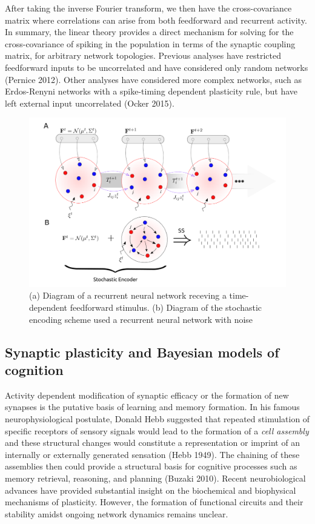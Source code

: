 \documentclass{ucetd}
\begin{document}
After taking the inverse Fourier transform, we then have the cross-covariance matrix where correlations can arise from both feedforward and recurrent activity. In summary, the linear theory provides a direct mechanism for solving for the cross-covariance of spiking in the population in terms of the synaptic coupling matrix, for arbitrary network topologies. Previous analyses have restricted feedforward inputs to be uncorrelated and have considered only random networks (Pernice 2012). Other analyses have considered more complex networks, such as Erdos-Renyni networks with a spike-timing dependent plasticity rule, but have left external input uncorrelated (Ocker 2015).

\begin{figure}[t!]
\centering
\includegraphics[width=150mm]{figure-1}
\caption{(a) Diagram of a recurrent neural network receving a time-dependent feedforward stimulus. (b) Diagram of the stochastic encoding scheme used a recurrent neural network with noise}
\end{figure}


\subsection{Synaptic plasticity and Bayesian models of cognition}

Activity dependent modification of synaptic efficacy or the formation of new synapses is the putative basis of learning and memory formation. In his famous neurophysiological postulate, Donald Hebb suggested that repeated stimulation of specific receptors of sensory signals would lead to the formation of a \emph{cell assembly} and these structural changes would constitute a representation or imprint of an internally or externally generated sensation (Hebb 1949). The chaining of these assemblies then could provide a structural basis for cognitive processes such as memory retrieval, reasoning, and planning (Buzaki 2010). Recent neurobiological advances have provided substantial insight on the biochemical and biophysical mechanisms of plasticity. However, the formation of functional circuits and their stability amidst ongoing network dynamics remains unclear.
\end{document}
